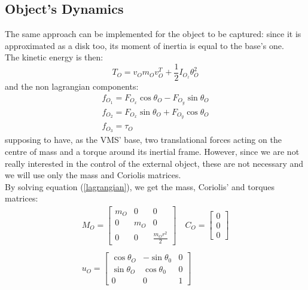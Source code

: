 \documentclass[a4paper,12pt,oneside]{report}
\begin{document}
\subsection{Object's Dynamics}\label{object_dynamics}
The same approach can be implemented for the object to be captured: since it is approximated as a disk too, its moment of inertia is equal to the base's one.\\
The kinetic energy is then:
\begin{equation}
  T_O=v_Om_Ov_O^T+\frac{1}{2}I_{O_z}\theta_O^2
\end{equation}
and the non lagrangian components:
\begin{equation}
  \begin{array}{l}
  f_{O_1}=F_{O_x}\cos{\theta_O}-F_{O_y}\sin{\theta_O}\\
  f_{O_2}=F_{O_x}\sin{\theta_O}+F_{O_y}\cos{\theta_O}\\
  f_{O_3}=\tau_O
  \end{array}
\end{equation}
supposing to have, as the VMS' base, two translational forces acting on the centre of mass and a torque around its inertial frame. However, since we are not really interested in the control of the external object, these are not necessary and we will use only the mass and Coriolis matrices.\\
By solving equation (\ref{lagrangian}), we get the mass, Coriolis' and torques matrices:
\begin{equation}
  \begin{array}{c}
    M_O=\begin{bmatrix}
      m_O&0&0\\
      0&m_O&0\\
      0&0&\frac{m_Or^2}{2}
    \end{bmatrix}\quad
    C_O=\begin{bmatrix}
      0\\0\\0
    \end{bmatrix}\\
    \\
    u_O=\begin{bmatrix}
      \cos{\theta_O}&-\sin{\theta_0}&0\\
      \sin{\theta_O}&\cos{\theta_0}&0\\
      0&0&1
    \end{bmatrix}
  \end{array}
  \label{object_matrices}
\end{equation}
\newpage
\end{document}
